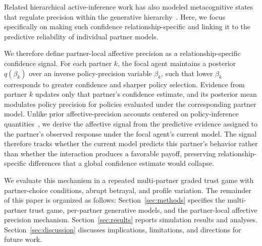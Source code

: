 Related hierarchical active-inference work has also modeled metacognitive states that regulate precision within the generative hierarchy~\cite{SandvedSmith2021MentalAction}. Here, we focus specifically on making such confidence relationship-specific and linking it to the predictive reliability of individual partner models.

We therefore define partner-local affective precision as a relationship-specific confidence signal. For each partner \(k\), the focal agent maintains a posterior \(q(\beta_k)\) over an inverse policy-precision variable \(\beta_k\), such that lower \(\beta_k\) corresponds to greater confidence and sharper policy selection. Evidence from partner \(k\) updates only that partner's confidence estimate, and its posterior mean modulates policy precision for policies evaluated under the corresponding partner model. Unlike prior affective-precision accounts centered on policy-inference quantities~\cite{Hesp2021DeeplyFeltAffect}, we derive the affective signal from the predictive evidence assigned to the partner's observed response under the focal agent's current model. The signal therefore tracks whether the current model predicts this partner's behavior rather than whether the interaction produces a favorable payoff, preserving relationship-specific differences that a global confidence estimate would collapse.

We evaluate this mechanism in a repeated multi-partner graded trust game with partner-choice conditions, abrupt betrayal, and profile variation. The remainder of this paper is organized as follows: Section~\ref{sec:methods} specifies the multi-partner trust game, per-partner generative models, and the partner-local affective precision mechanism. Section~\ref{sec:results} reports simulation results and analyses. Section~\ref{sec:discussion} discusses implications, limitations, and directions for future work.
